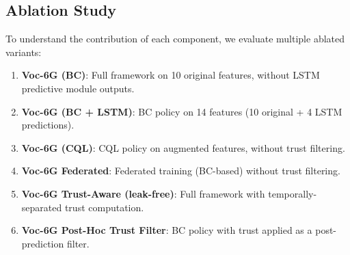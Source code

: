 \documentclass[journal,twoside]{IEEEtran}
\begin{document}
\subsection{Ablation Study}
\label{sec:ablation}

To understand the contribution of each component, we evaluate multiple ablated variants:

\begin{enumerate}
    \item \textbf{Voc-6G (BC)}: Full framework on 10 original features, without LSTM predictive module outputs.
    \item \textbf{Voc-6G (BC + LSTM)}: BC policy on 14 features (10 original + 4 LSTM predictions).
    \item \textbf{Voc-6G (CQL)}: CQL policy on augmented features, without trust filtering.
    \item \textbf{Voc-6G Federated}: Federated training (BC-based) without trust filtering.
    \item \textbf{Voc-6G Trust-Aware (leak-free)}: Full framework with temporally-separated trust computation.
    \item \textbf{Voc-6G Post-Hoc Trust Filter}: BC policy with trust applied as a post-prediction filter.
\end{enumerate}
\end{document}

